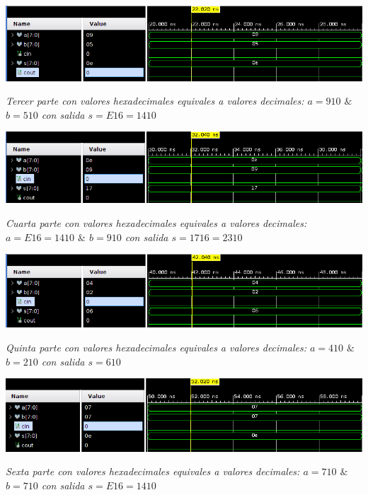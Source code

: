 \documentclass[12pt,executivepaper]{article}
\begin{document}
\begin{flushleft}
	\includegraphics[scale=0.55]{imgs/tercera.png}
\end{flushleft}
\begin{center}
    \textit{Tercer parte con valores hexadecimales equivales a valores decimales: $a=9{\scriptscriptstyle10}$ $\&$ $b=5{\scriptscriptstyle10}$ con salida $s = E{\scriptscriptstyle16}= 14{\scriptscriptstyle10}$}  
\end{center}


\begin{flushleft}
	\includegraphics[scale=0.55]{imgs/cuarta.png}
\end{flushleft}
\begin{center}
    \textit{Cuarta parte con valores hexadecimales equivales a valores decimales: $a=E{\scriptscriptstyle16}=14{\scriptscriptstyle10}$ $\&$ $b=9{\scriptscriptstyle10}$ con salida $s =17{\scriptscriptstyle16}=23{\scriptscriptstyle10}$}
\end{center}

\begin{flushleft}
	\includegraphics[scale=0.55]{imgs/quinta.png}
\end{flushleft}
\begin{center}
    \textit{Quinta parte con valores hexadecimales equivales a valores decimales: $a=4{\scriptscriptstyle10}$ $\&$ $b=2{\scriptscriptstyle10}$ con salida $s = 6{\scriptscriptstyle10}$}
\end{center}

\begin{flushleft}
	\includegraphics[scale=0.55]{imgs/sexta.png}
\end{flushleft}
\begin{center}
    \textit{Sexta parte con valores hexadecimales equivales a valores decimales: $a=7{\scriptscriptstyle10}$ $\&$ $b=7{\scriptscriptstyle10}$ con salida $s =E{\scriptscriptstyle16}=14{\scriptscriptstyle10}$}
\end{center}
\end{document}
